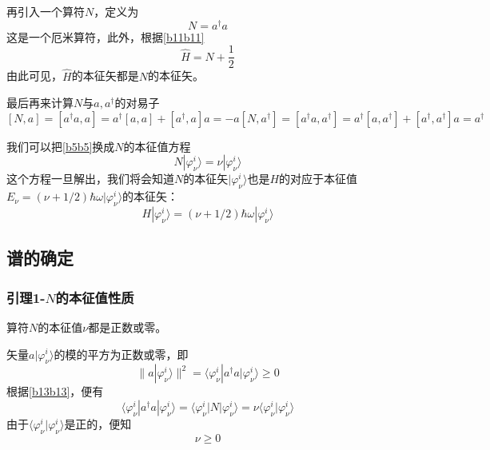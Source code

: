 \documentclass[]{article}
\begin{document}
再引入一个算符$N$，定义为
\begin{equation}
	N=a^\dagger a
	\label{b13b13}
\end{equation}
这是一个厄米算符，此外，根据\eqref{b11b11}
\begin{equation}
	\widehat{H}=N+\dfrac{1}{2}
\end{equation}
由此可见，$\widehat{H}$的本征矢都是$N$的本征矢。\par 
最后再来计算$N$与$a,a^\dagger$的对易子
\begin{subequations}
	\begin{equation}
		[N,a]=[a^\dagger a,a]=a^\dagger[a,a]+[a^\dagger,a]a=-a
		\label{b17a}
	\end{equation}
	\begin{equation}
		[N,a^\dagger]=[a^\dagger a,a^\dagger]=a^\dagger[a,a^\dagger]+[a^\dagger,a^\dagger]a=a^\dagger
		\label{b17b}
	\end{equation}
\end{subequations}

我们可以把\eqref{b5b5}换成$N$的本征值方程
\begin{equation}
	N|\varphi_\nu^i\rangle=\nu|\varphi_\nu^i\rangle
\end{equation}
这个方程一旦解出，我们将会知道$N$的本征矢$|\varphi_\nu^i\rangle$也是$H$的对应于本征值$E_\nu=(\nu+1/2)\hbar\omega|\varphi_\nu^i\rangle$的本征矢：
\begin{equation}
	H|\varphi_\nu^i\rangle=(\nu+1/2)\hbar\omega|\varphi_\nu^i\rangle
	\label{b19b19}
\end{equation}
\subsection{谱的确定}
\subsubsection{引理1-$N$的本征值性质}
算符$N$的本征值$\nu$都是正数或零。\par 
矢量$a|\varphi_\nu^i\rangle$的模的平方为正数或零，即
\begin{equation}
	\|a|\varphi_\nu^i\rangle\|^2=\langle\varphi_\nu^i|a^\dagger a|\varphi_\nu^i\rangle\geqslant0
\end{equation}
根据\eqref{b13b13}，便有
\begin{equation}
	\langle\varphi_\nu^i|a^\dagger a|\varphi_\nu^i\rangle=\langle\varphi_\nu^i|N|\varphi_\nu^i\rangle=\nu\langle\varphi_\nu^i|\varphi_\nu^i\rangle
	\label{b21b21}
\end{equation}
由于$\langle\varphi_\nu^i|\varphi_\nu^i\rangle$是正的，便知
\begin{equation}
	\nu\geqslant0
\end{equation}
\end{document}
